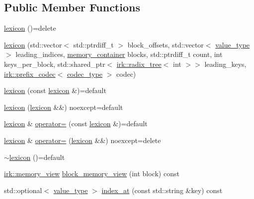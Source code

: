 \subsection*{Public Member Functions}
\begin{DoxyCompactItemize}
\item 
\mbox{\hyperlink{classirk_1_1lexicon_a6edaaa02c9188690d6e8fcdf1ed11b4b}{lexicon}} ()=delete
\item 
\mbox{\hyperlink{classirk_1_1lexicon_a11bacbecd3c53c7a212ff7c0e25c3f5e}{lexicon}} (std\+::vector$<$ std\+::ptrdiff\+\_\+t $>$ block\+\_\+offsets, std\+::vector$<$ \mbox{\hyperlink{classirk_1_1lexicon_aeac00a0cdd67339d9d09783a1c930dd2}{value\+\_\+type}} $>$ leading\+\_\+indices, \mbox{\hyperlink{classirk_1_1lexicon_a2097b1f4bfc324504a9fe10af681b0be}{memory\+\_\+container}} blocks, std\+::ptrdiff\+\_\+t count, int keys\+\_\+per\+\_\+block, std\+::shared\+\_\+ptr$<$ \mbox{\hyperlink{classirk_1_1radix__tree}{irk\+::radix\+\_\+tree}}$<$ int $>$$>$ leading\+\_\+keys, \mbox{\hyperlink{classirk_1_1prefix__codec}{irk\+::prefix\+\_\+codec}}$<$ \mbox{\hyperlink{classirk_1_1lexicon_a3ec38dbe131c7b0a9551d05ad619fc89}{codec\+\_\+type}} $>$ codec)
\item 
\mbox{\hyperlink{classirk_1_1lexicon_a90aa432b9b358af16a22b7ce990c1ebb}{lexicon}} (const \mbox{\hyperlink{classirk_1_1lexicon}{lexicon}} \&)=default
\item 
\mbox{\hyperlink{classirk_1_1lexicon_aacc2d5a3f49dacc2dcf13480b904c252}{lexicon}} (\mbox{\hyperlink{classirk_1_1lexicon}{lexicon}} \&\&) noexcept=default
\item 
\mbox{\hyperlink{classirk_1_1lexicon}{lexicon}} \& \mbox{\hyperlink{classirk_1_1lexicon_a4563e93e133a21588097c4bcc20335bd}{operator=}} (const \mbox{\hyperlink{classirk_1_1lexicon}{lexicon}} \&)=default
\item 
\mbox{\hyperlink{classirk_1_1lexicon}{lexicon}} \& \mbox{\hyperlink{classirk_1_1lexicon_a82c097a1fabbd328402d3bc665aa1f47}{operator=}} (\mbox{\hyperlink{classirk_1_1lexicon}{lexicon}} \&\&) noexcept=delete
\item 
\mbox{\hyperlink{classirk_1_1lexicon_a4bfb764feda1ecabe2347d85c133edb3}{$\sim$lexicon}} ()=default
\item 
\mbox{\hyperlink{classirk_1_1memory__view}{irk\+::memory\+\_\+view}} \mbox{\hyperlink{classirk_1_1lexicon_a1eacbab9f09dd3514f6940fdddcae250}{block\+\_\+memory\+\_\+view}} (int block) const
\item 
std\+::optional$<$ \mbox{\hyperlink{classirk_1_1lexicon_aeac00a0cdd67339d9d09783a1c930dd2}{value\+\_\+type}} $>$ \mbox{\hyperlink{classirk_1_1lexicon_a41b1c0e665b7fa6aed0f92ef9facf82c}{index\+\_\+at}} (const std\+::string \&key) const
$$
\end{DoxyCompactItemize}

